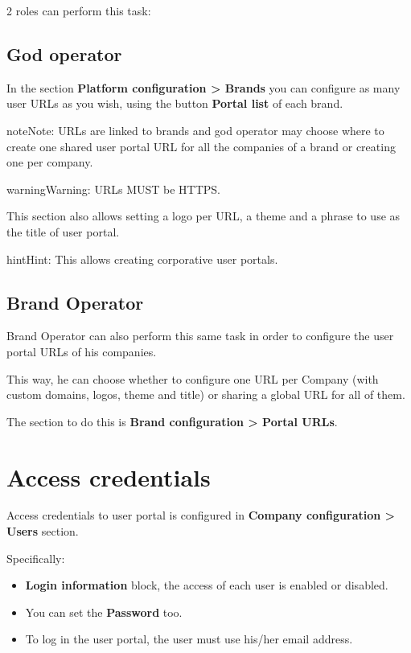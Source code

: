 \documentclass[letterpaper,10pt,english]{sphinxmanual}
\begin{document}
2 roles can perform this task:


\subsection{God operator}
\label{userportal/index:god-operator}
In the section \textbf{Platform configuration \textgreater{} Brands} you can configure as many
user URLs as you wish, using the button \textbf{Portal list} of each brand.

\begin{notice}{note}{Note:}
URLs are linked to brands and god operator may choose where to create
one shared user portal URL for all the companies of a brand or creating
one per company.
\end{notice}

\begin{notice}{warning}{Warning:}
URLs MUST be HTTPS.
\end{notice}

This section also allows setting a logo per URL, a theme and a phrase to use as
the title of user portal.

\begin{notice}{hint}{Hint:}
This allows creating corporative user portals.
\end{notice}


\subsection{Brand Operator}
\label{userportal/index:brand-operator}
Brand Operator can also perform this same task in order to configure the user
portal URLs of his companies.

This way, he can choose whether to configure one URL per Company (with custom
domains, logos, theme and title) or sharing a global URL for all of them.

The section to do this is \textbf{Brand configuration \textgreater{} Portal URLs}.


\section{Access credentials}
\label{userportal/index:access-credentials}
Access credentials to user portal is configured in \textbf{Company configuration \textgreater{}
Users} section.

Specifically:
\begin{itemize}
\item {} 
\textbf{Login information} block, the access of each user is enabled or disabled.

\item {} 
You can set the \textbf{Password} too.

\item {} 
To log in the user portal, the user must use his/her email address.

\end{itemize}
\end{document}

